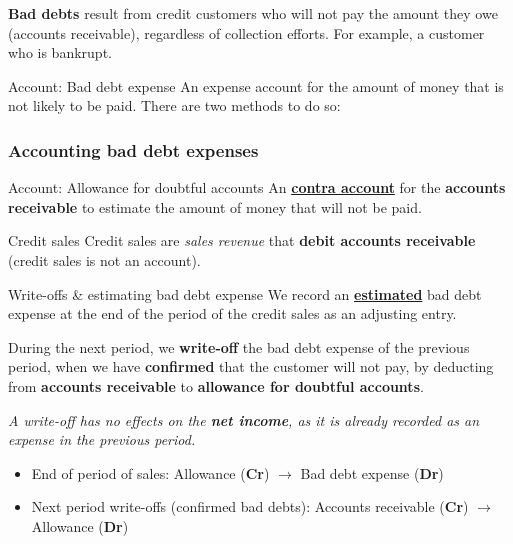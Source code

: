 \textbf{Bad debts} result from credit customers who will not pay the amount they owe (accounts receivable), regardless of collection efforts. For example, a customer who is bankrupt.

\begin{definition}
    {Account: Bad debt expense}
    An expense account for the amount of money that is not likely to be paid. There are two methods to do so:
\end{definition}


\subsubsection{Accounting bad debt expenses}

\begin{definition}
    {Account: Allowance for doubtful accounts}
    An \hyperref[def:contra]{\textbf{contra account}} for the \textbf{accounts receivable} to estimate the amount of money that will not be paid.
\end{definition}

\begin{theorem}
    {Credit sales}
    Credit sales are \textit{sales revenue} that \textbf{debit accounts receivable} (credit sales is not an account).
\end{theorem}

\begin{knBox}
    {Write-offs \& estimating bad debt expense}
    We record an \hyperref[thm:bad_debt_est]{\textbf{estimated}} bad debt expense at the end of the period of the credit sales as an adjusting entry.

    \vspace{0.3em}

    During the next period, we \textbf{write-off} the bad debt expense of the previous period, when we have \textbf{confirmed} that the customer will not pay, by deducting from \textbf{accounts receivable} to \textbf{allowance for doubtful accounts}.
    
    \vspace{0.3em}
    
    \textit{A write-off has no effects on the \textbf{net income}, as it is already recorded as an expense in the previous period.}
    
    \begin{itemize}
        \item End of period of sales: Allowance (\textbf{Cr}) $\rightarrow$ Bad debt expense (\textbf{Dr})
        \item Next period write-offs (confirmed bad debts): Accounts receivable (\textbf{Cr}) $\rightarrow$ Allowance (\textbf{Dr})
    \end{itemize}
    
\end{knBox}

